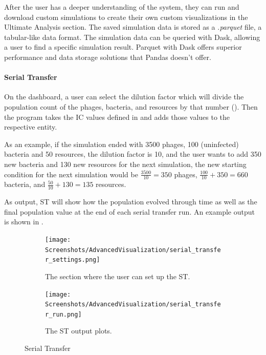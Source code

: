 After the user has a deeper understanding of the system, they can run and download custom simulations to create their own custom visualizations in the Ultimate Analysis section. 
The saved simulation data is stored as a \textit{.parquet} file, a tabular-like data format. 
The simulation data can be queried with Dask, allowing a user to find a specific simulation result. 
Parquet with Dask offers superior performance and data storage solutions that Pandas doesn't offer.

\paragraph{Serial Transfer}
\label{sec:serial_transfer}
On the dashboard, a user can select the dilution factor which will divide the population count of the phages, bacteria, and resources by that number ().
Then the program takes the IC values defined in  and adds those values to the respective entity. 

As an example, if the simulation ended with 3500 phages, 100 (uninfected) bacteria and 50 resources, the dilution factor is 10, and the user wants to add 350 new bacteria and 130 new resources for the next simulation, the new starting condition for the next simulation would be $\frac{3500}{10} = 350$ phages, $\frac{100}{10} + 350 = 660$ bacteria, and $\frac{50}{10} + 130 = 135$ resources.

As output, ST will show how the population evolved through time as well as the final population value at the end of each serial transfer run. 
An example output is shown in .

\begin{figure}[h!]
    \centering
    \begin{subfigure}{0.49\linewidth}
        \centering
        \captionsetup{width=1\linewidth}
        \texttt{[image: Screenshots/AdvancedVisualization/serial\_transfer\_settings.png]}
        \caption{
            The section where the user can set up the ST.
        }
        \label{fig:ss:av:serial_transfer_settings}
    \end{subfigure}
    \hfill
    \begin{subfigure}{0.49\linewidth}
        \centering
        \captionsetup{width=1\linewidth}
        \texttt{[image: Screenshots/AdvancedVisualization/serial\_transfer\_run.png]}
        \caption{
            The ST output plots. 
        }
        \label{fig:ss:av:serial_transfer_run}
    \end{subfigure}
    \caption{Serial Transfer}
 \end{figure}

